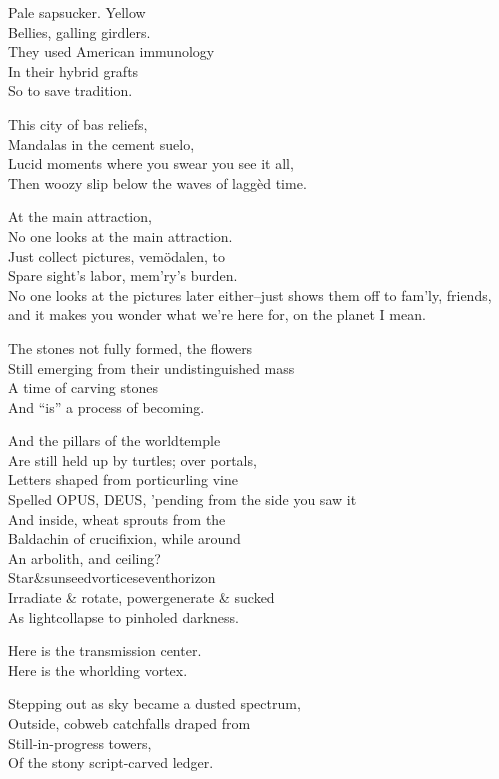 
Pale sapsucker. Yellow \\
Bellies, galling girdlers. \\
They used American immunology \\
In their hybrid grafts \\
So to save tradition.

This city of bas reliefs, \\
Mandalas in the cement suelo, \\
Lucid moments where you swear you see it all, \\
Then woozy slip below the waves of laggèd time.

At the main attraction, \\
No one looks at the main attraction. \\
Just collect pictures, vemödalen, to \\
Spare sight's labor, mem'ry's burden. \\

No one looks at the pictures later either--just shows them off to fam'ly, friends, and it makes you wonder what we're here for, on the planet I mean.

The stones not fully formed, the flowers \\
Still emerging from their undistinguished mass \\
A time of carving stones \\
And ``is'' a process of becoming.

And the pillars of the worldtemple \\
Are still held up by turtles; over portals, \\
Letters shaped from porticurling vine \\
Spelled OPUS, DEUS, 'pending from the side you saw it \\
And inside, wheat sprouts from the  \\
Baldachin of crucifixion, while around \\
An arbolith, and ceiling?  \\
Star\&sunseedvorticeseventhorizon \\
Irradiate \& rotate, powergenerate \& sucked \\
As lightcollapse to pinholed darkness.

Here is the transmission center. \\
Here is the whorlding vortex.

Stepping out as sky became a dusted spectrum, \\ 
Outside, cobweb catchfalls draped from \\
Still-in-progress towers, \\
Of the stony script-carved ledger.

